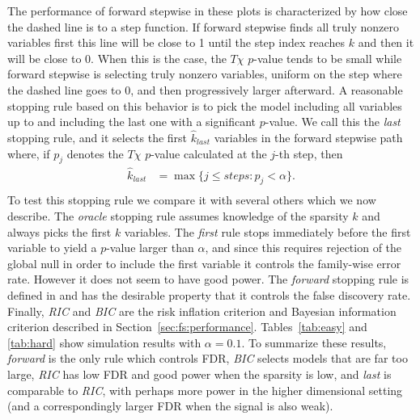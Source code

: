 \documentclass{imsart}
\begin{document}
The performance of forward stepwise in these plots is characterized by how
close the dashed line is to a step function. If forward stepwise finds all
truly nonzero variables first this line will be close to 1 until the step
index reaches $k$ and then it will be close to 0. When this is the case,
the $T\chi$ $p$-value tends to be small while forward stepwise is selecting truly
nonzero variables, uniform on the step where the dashed line goes to 0,
and then progressively larger afterward. A reasonable stopping rule based
on this behavior is to pick the model including all variables up to and
including the last one with a significant $p$-value. We call this the
\textit{last} stopping rule, and it selects the first $\hat k_\textit{last}$
variables in the forward stepwise path where, if
$p_j$ denotes the $T\chi$ $p$-value calculated at the $j$-th step, then
\begin{equation}
  \label{eq:klast}
  \begin{aligned}
    \hat k_\textit{last} & = \max \{ j \leq steps : p_j < \alpha \}. \\
  \end{aligned}
\end{equation}
To test this stopping rule we compare it with several others which we now
describe. The \textit{oracle} stopping rule assumes knowledge of the
sparsity $k$ and always picks the first $k$ variables. The \textit{first}
rule stops immediately before the first variable to yield a $p$-value
larger than $\alpha$, and since this requires rejection of the global 
null in order to include the first variable
it controls the family-wise error rate. However it does not seem to have
good power.
The \textit{forward}
stopping rule is defined in \cite{sequential:fdr} and has the desirable
property that it controls the false discovery rate. Finally, \textit{RIC}
and \textit{BIC}
are the risk inflation criterion and Bayesian information criterion
described in Section~\ref{sec:fs:performance}. Tables~\ref{tab:easy} and
\ref{tab:hard} show simulation results with $\alpha = 0.1$.
To summarize these results, \textit{forward} is the only rule which
controls FDR, \textit{BIC} selects models that are far too large,
\textit{RIC} has low FDR and good power when the sparsity is low,
and \textit{last} is comparable to \textit{RIC},
with perhaps more power in the higher dimensional setting
(and a correspondingly larger FDR when the signal is also weak).





\end{document}
